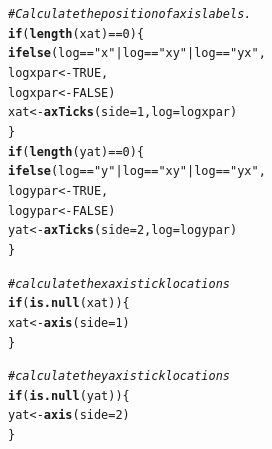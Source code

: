 \documentclass{article}\usepackage[]{graphicx}\usepackage[]{color}
\makeatletter
\newcommand{\hlnum}[1]{\textcolor[rgb]{0.686,0.059,0.569}{#1}}%
\newcommand{\hlstr}[1]{\textcolor[rgb]{0.192,0.494,0.8}{#1}}%
\newcommand{\hlcom}[1]{\textcolor[rgb]{0.678,0.584,0.686}{\textit{#1}}}%
\newcommand{\hlopt}[1]{\textcolor[rgb]{0,0,0}{#1}}%
\newcommand{\hlstd}[1]{\textcolor[rgb]{0.345,0.345,0.345}{#1}}%
\newcommand{\hlkwa}[1]{\textcolor[rgb]{0.161,0.373,0.58}{\textbf{#1}}}%
\newcommand{\hlkwb}[1]{\textcolor[rgb]{0.69,0.353,0.396}{#1}}%
\newcommand{\hlkwc}[1]{\textcolor[rgb]{0.333,0.667,0.333}{#1}}%
\newcommand{\hlkwd}[1]{\textcolor[rgb]{0.737,0.353,0.396}{\textbf{#1}}}%
\newenvironment{kframe}{%
 \def\at@end@of@kframe{}%
 \ifinner\ifhmode%
  \def\at@end@of@kframe{\end{minipage}}%
  \begin{minipage}{\columnwidth}%
 \fi\fi%
 \def\FrameCommand##1{\hskip\@totalleftmargin \hskip-\fboxsep
 \colorbox{shadecolor}{##1}\hskip-\fboxsep
     \hskip-\linewidth \hskip-\@totalleftmargin \hskip\columnwidth}%
 \MakeFramed {\advance\hsize-\width
   \@totalleftmargin\z@ \linewidth\hsize
   \@setminipage}}%
 {\par\unskip\endMakeFramed%
 \at@end@of@kframe}
\newenvironment{knitrout}{}{} %
\makeatother
\begin{document}
\begin{knitrout}
\begin{kframe}
\begin{alltt}
    \hlcom{# Calculate the position of axis labels.}
    \hlkwa{if} \hlstd{(}\hlkwd{length}\hlstd{(xat)} \hlopt{==} \hlnum{0}\hlstd{) \{}
      \hlkwd{ifelse} \hlstd{(log} \hlopt{==} \hlstr{"x"} \hlopt{|} \hlstd{log} \hlopt{==} \hlstr{"xy"} \hlopt{|} \hlstd{log} \hlopt{==} \hlstr{"yx"}\hlstd{,}
        \hlstd{logxpar} \hlkwb{<-} \hlnum{TRUE}\hlstd{,}
        \hlstd{logxpar} \hlkwb{<-} \hlnum{FALSE}\hlstd{)}
      \hlstd{xat} \hlkwb{<-} \hlkwd{axTicks}\hlstd{(}\hlkwc{side} \hlstd{=} \hlnum{1}\hlstd{,} \hlkwc{log} \hlstd{= logxpar)}
    \hlstd{\}}
    \hlkwa{if} \hlstd{(}\hlkwd{length}\hlstd{(yat)} \hlopt{==} \hlnum{0}\hlstd{) \{}
      \hlkwd{ifelse} \hlstd{(log} \hlopt{==} \hlstr{"y"} \hlopt{|} \hlstd{log} \hlopt{==} \hlstr{"xy"} \hlopt{|} \hlstd{log} \hlopt{==} \hlstr{"yx"}\hlstd{,}
              \hlstd{logypar} \hlkwb{<-} \hlnum{TRUE}\hlstd{,}
              \hlstd{logypar} \hlkwb{<-} \hlnum{FALSE}\hlstd{)}
      \hlstd{yat} \hlkwb{<-} \hlkwd{axTicks}\hlstd{(}\hlkwc{side} \hlstd{=} \hlnum{2}\hlstd{,} \hlkwc{log} \hlstd{= logypar)}
    \hlstd{\}}

    \hlcom{# calculate the x axis tick locations}
    \hlkwa{if} \hlstd{(}\hlkwd{is.null}\hlstd{(xat)) \{}
     \hlstd{xat} \hlkwb{<-} \hlkwd{axis}\hlstd{(}\hlkwc{side} \hlstd{=} \hlnum{1}\hlstd{)}
    \hlstd{\}}

    \hlcom{# calculate the y axis tick locations}
    \hlkwa{if} \hlstd{(}\hlkwd{is.null}\hlstd{(yat)) \{}
      \hlstd{yat} \hlkwb{<-} \hlkwd{axis}\hlstd{(}\hlkwc{side} \hlstd{=} \hlnum{2}\hlstd{)}
    \hlstd{\}}


\end{alltt}
\end{kframe}
\end{knitrout}
\end{document}
